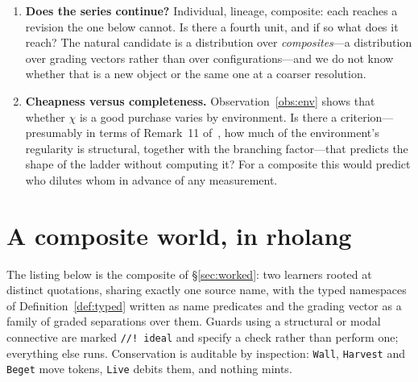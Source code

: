 \documentclass[11pt,a4paper]{article}
\theoremstyle{plain}
\theoremstyle{definition}
\theoremstyle{remark}
\begin{document}
\begin{enumerate}[itemsep=4pt]
\item \textbf{Does the series continue?}\label{op:series} Individual, lineage, composite: each
reaches a revision the one below cannot. Is there a fourth unit, and if so what does it reach?
The natural candidate is a distribution over \emph{composites}---a distribution over grading
vectors rather than over configurations---and we do not know whether that is a new object or the
same one at a coarser resolution.

\item \textbf{Cheapness versus completeness.} Observation~\ref{obs:env} shows that whether $\chi$
is a good purchase varies by environment. Is there a criterion---presumably in terms of Remark~11
of~\cite{scientist}, how much of the environment's regularity is structural, together with the
branching factor---that predicts the shape of the ladder without computing it? For a composite
this would predict who dilutes whom in advance of any measurement.
\end{enumerate}

\appendix

\section{A composite world, in rholang}\label{app:world}

The listing below is the composite of \S\ref{sec:worked}: two learners rooted at distinct
quotations, sharing exactly one source name, with the typed namespaces of
Definition~\ref{def:typed} written as name predicates and the grading vector as a family of
graded separations over them. Guards using a structural or modal connective are marked
\texttt{//!\ ideal} and specify a check rather than perform one; everything else runs.
Conservation is auditable by inspection: \texttt{Wall}, \texttt{Harvest} and \texttt{Beget} move
tokens, \texttt{Live} debits them, and nothing mints.
\end{document}
